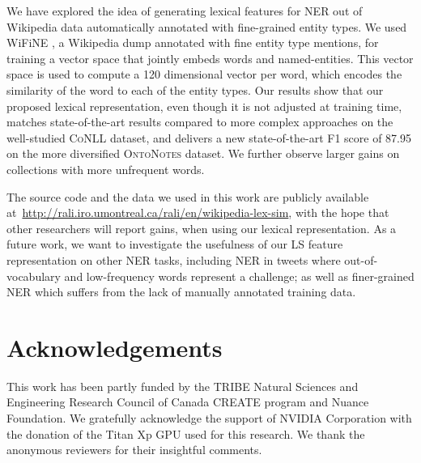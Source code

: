 \documentclass[11pt]{article}
\newcommand{\conll}{\textsc{CoNLL}}
\newcommand{\onto}{\textsc{OntoNotes}}
\newcommand{\lr}{\textsc{LS}}
\newcommand{\wifine}{WiFiNE}
\begin{document}
	We have explored the idea of generating lexical features for NER out of Wikipedia data automatically annotated with fine-grained entity types. We used \wifine{ }\cite{ghaddara2018wifine}, a Wikipedia dump annotated with fine entity type mentions, for training a vector space that jointly embeds words and named-entities. This vector space is used to compute a 120 dimensional vector per word, which encodes the similarity of the word to each of the entity types. Our results show that our proposed lexical representation, even though it is not adjusted at training time, matches state-of-the-art results compared to more complex approaches on the well-studied \conll{} dataset, and delivers a new state-of-the-art F1 score of 87.95 on the more diversified \onto{} dataset. We further observe larger gains  on collections  with more unfrequent words. 

	The source code and the data we used in this work are publicly available at~\url{http://rali.iro.umontreal.ca/rali/en/wikipedia-lex-sim}, with the hope that other researchers will report gains, when using our lexical representation.	As a future work, we want to investigate the usefulness of our \lr{} feature representation on other NER tasks, including NER in tweets where  out-of-vocabulary and low-frequency words represent a challenge; as well as finer-grained NER which suffers  from the lack of manually annotated training data. 
	
	\section*{Acknowledgements}
	This work has been partly funded by the TRIBE Natural Sciences and Engineering Research Council of Canada CREATE program and Nuance Foundation. We gratefully acknowledge the support of NVIDIA Corporation with the donation of the Titan Xp GPU used for this research. We thank the anonymous reviewers for their insightful comments.
	
	
	
	
	
\end{document}
